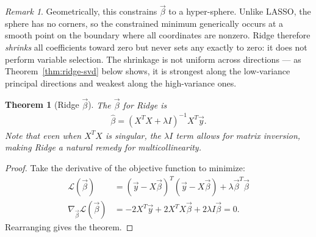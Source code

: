 \documentclass[11pt]{article}
\theoremstyle{definition}
\theoremstyle{plain}
\newtheorem{theorem}{Theorem}[section]
\theoremstyle{remark}
\newtheorem{remark}{Remark}[section]
\begin{document}
\begin{remark}
    Geometrically, this constrains $\vec{\beta}$ to a hyper-sphere. Unlike LASSO, the sphere has no corners, so the constrained minimum generically occurs at a smooth point on the boundary where all coordinates are nonzero. Ridge therefore \emph{shrinks} all coefficients toward zero but never sets any exactly to zero: it does not perform variable selection. The shrinkage is not uniform across directions --- as Theorem~\ref{thm:ridge-svd} below shows, it is strongest along the low-variance principal directions and weakest along the high-variance ones.
\end{remark}

\begin{theorem}[Ridge $\vec{\beta}$]
    The $\vec{\beta}$ for Ridge is
    \begin{align}
        \hat{\beta} = (X^TX + \lambda I)^{-1}X^T \vec{y}.
    \end{align}
    Note that even when $X^TX$ is singular, the $\lambda I$ term allows for matrix inversion, making Ridge a natural remedy for multicollinearity.
\end{theorem}
\begin{proof}
    Take the derivative of the objective function to minimize:
    \begin{align}
        \mathcal{L}(\vec{\beta}) &= (\vec{y}-X\vec{\beta})^T(\vec{y}-X\vec{\beta}) + \lambda \vec{\beta}^T\vec{\beta} \\
        \nabla_{\vec{\beta}}\mathcal{L}(\vec{\beta}) &= -2X^T\vec{y} + 2 X^TX\vec{\beta} + 2 \lambda I \vec{\beta} = 0.
    \end{align}
    Rearranging gives the theorem.
\end{proof}
\end{document}
